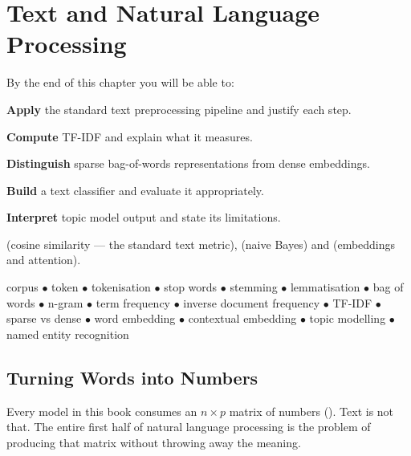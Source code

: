 \chapter{Text and Natural Language Processing}\label{ch:nlp}

\begin{outcomes}
By the end of this chapter you will be able to:
\begin{tight}
  \item \textbf{Apply} the standard text preprocessing pipeline and justify each step.
  \item \textbf{Compute} TF-IDF and explain what it measures.
  \item \textbf{Distinguish} sparse bag-of-words representations from dense embeddings.
  \item \textbf{Build} a text classifier and evaluate it appropriately.
  \item \textbf{Interpret} topic model output and state its limitations.
\end{tight}
\end{outcomes}

\begin{prereq}
 (cosine similarity --- the standard text metric),
 (naive Bayes) and  (embeddings and
attention).
\end{prereq}

\begin{keyterms}
corpus $\bullet$ token $\bullet$ tokenisation $\bullet$ stop words $\bullet$
stemming $\bullet$ lemmatisation $\bullet$ bag of words $\bullet$ n-gram $\bullet$
term frequency $\bullet$ inverse document frequency $\bullet$ TF-IDF $\bullet$
sparse vs dense $\bullet$ word embedding $\bullet$ contextual embedding $\bullet$
topic modelling $\bullet$ named entity recognition
\end{keyterms}

\section{Turning Words into Numbers}

Every model in this book consumes an $n \times p$ matrix of numbers
(). Text is not that. The entire first half of natural
language processing is the problem of producing that matrix without throwing away
the meaning.

